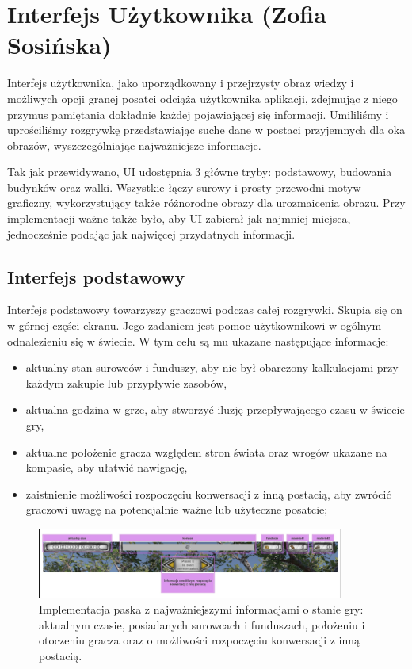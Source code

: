 \section{Interfejs Użytkownika (Zofia Sosińska)}\label{chap:ui_imp}
Interfejs użytkownika, jako uporządkowany i przejrzysty obraz wiedzy i możliwych opcji granej posatci odciąża użytkownika
aplikacji, zdejmując z niego przymus pamiętania dokładnie każdej pojawiającej się informacji. Umililiśmy i uprościliśmy 
rozgrywkę przedstawiając suche dane w postaci przyjemnych dla oka obrazów, wyszczególniając najważniejsze informacje.

Tak jak przewidywano, UI udostępnia 3 główne tryby: podstawowy, budowania budynków oraz walki. Wszystkie łączy surowy 
i prosty przewodni motyw graficzny, wykorzystujący także różnorodne obrazy dla urozmaicenia obrazu. Przy implementacji ważne także było, aby UI zabierał jak najmniej miejsca, jednocześnie podając jak 
najwięcej przydatnych informacji.

\subsection{Interfejs podstawowy}
Interfejs podstawowy towarzyszy graczowi podczas całej rozgrywki. Skupia się on w górnej części ekranu. Jego zadaniem jest pomoc 
użytkownikowi w ogólnym odnalezieniu się w świecie. W tym celu są mu ukazane następujące informacje:
\begin{itemize}
    \item aktualny stan surowców i funduszy, aby nie był obarczony kalkulacjami przy każdym zakupie lub przypływie zasobów,
    \item aktualna godzina w grze, aby stworzyć iluzję przepływającego czasu w świecie gry,
    \item aktualne położenie gracza względem stron świata oraz wrogów ukazane na kompasie, aby ułatwić nawigację,
    \item zaistnienie możliwości rozpoczęciu konwersacji z inną postacią, aby zwrócić graczowi uwagę na potencjalnie ważne lub użyteczne posatcie;
\end{itemize}

\begin{figure}[htbp]
    \centering
    \includegraphics[width=0.9\textwidth]{images/ui/naszpasek.png}
    \caption{Implementacja paska z najważniejszymi informacjami o stanie gry: aktualnym czasie, posiadanych surowcach 
    i funduszach, położeniu i otoczeniu gracza oraz o możliwości rozpoczęciu konwersacji z inną postacią.
    }\label{fig:compass}
\end{figure}


